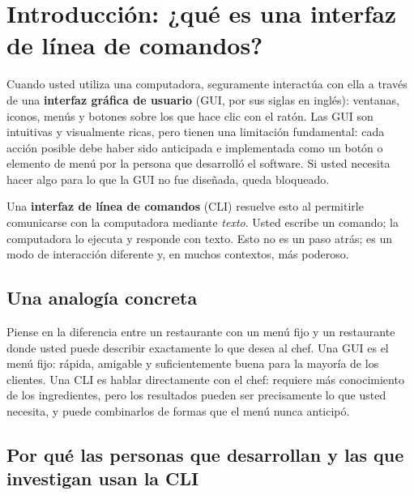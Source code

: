 \section{Introducción: ¿qué es una interfaz de línea de comandos?}
\label{sec:cli-intro}

Cuando usted utiliza una computadora, seguramente interactúa con ella a
través de una \textbf{interfaz gráfica de usuario} (GUI, por sus siglas en
inglés): ventanas, iconos, menús y botones sobre los que hace clic con el
ratón. Las GUI son intuitivas y visualmente ricas, pero tienen una
limitación fundamental: cada acción posible debe haber sido anticipada e
implementada como un botón o elemento de menú por la persona que desarrolló
el software. Si usted necesita hacer algo para lo que la GUI no fue diseñada,
queda bloqueado.

Una \textbf{interfaz de línea de comandos} (CLI) resuelve esto al permitirle
comunicarse con la computadora mediante \emph{texto}. Usted escribe un
comando; la computadora lo ejecuta y responde con texto. Esto no es un paso
atrás; es un modo de interacción diferente y, en muchos contextos, más
poderoso.

\subsection{Una analogía concreta}

Piense en la diferencia entre un restaurante con un menú fijo y un
restaurante donde usted puede describir exactamente lo que desea al chef.
Una GUI es el menú fijo: rápida, amigable y suficientemente buena para la
mayoría de los clientes. Una CLI es hablar directamente con el chef: requiere
más conocimiento de los ingredientes, pero los resultados pueden ser
precisamente lo que usted necesita, y puede combinarlos de formas que el
menú nunca anticipó.

\subsection{Por qué las personas que desarrollan y las que investigan usan la CLI}

